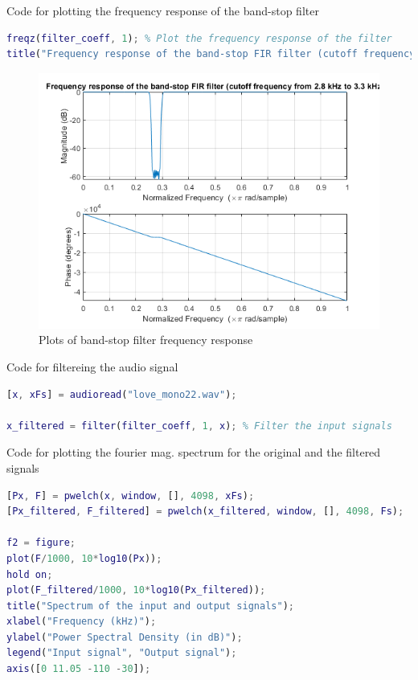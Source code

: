 \documentclass{article}
\begin{document}
Code for plotting the frequency response of the band-stop filter
\begin{lstlisting}[language=Matlab]
freqz(filter_coeff, 1); % Plot the frequency response of the filter
title("Frequency response of the band-stop FIR filter (cutoff frequency from 2.8 kHz to 3.3 kHz)");
\end{lstlisting}

\begin{figure}[h!]
\includegraphics[width=\textwidth]{BSF.png}
\caption{Plots of band-stop filter frequency response}
\end{figure}

Code for filtereing the audio signal
\begin{lstlisting}[language=Matlab]
[x, xFs] = audioread("love_mono22.wav");

x_filtered = filter(filter_coeff, 1, x); % Filter the input signals
\end{lstlisting}

Code for plotting the fourier mag. spectrum for the original and the filtered signals
\begin{lstlisting}[language=Matlab]
% Power Spectral Density of the input signal and output signal
[Px, F] = pwelch(x, window, [], 4098, xFs);
[Px_filtered, F_filtered] = pwelch(x_filtered, window, [], 4098, Fs);

f2 = figure;
plot(F/1000, 10*log10(Px));
hold on;
plot(F_filtered/1000, 10*log10(Px_filtered));
title("Spectrum of the input and output signals");
xlabel("Frequency (kHz)");
ylabel("Power Spectral Density (in dB)");
legend("Input signal", "Output signal");
axis([0 11.05 -110 -30]);
\end{lstlisting}
\end{document}
